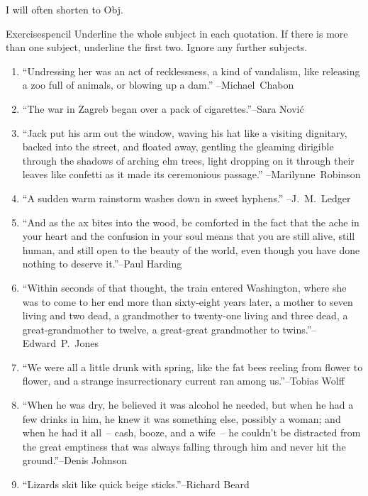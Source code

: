 I will often shorten  to Obj.


\begin{tblsframedsymbol}{Exercises}{pencil}
    Underline the whole subject in each quotation. If there is more than one subject, underline the first two. Ignore any further subjects.
    \begin{enumerate}[noitemsep, leftmargin=*]
        \item \enquote{Undressing her was an act of recklessness, a kind of vandalism, like releasing a zoo full of animals, or blowing up a dam.} \phantom{xxxxxxxxxxxxxx} \hfill--Michael~Chabon
       \item \enquote{The war in Zagreb began over a pack of cigarettes.}\hfill--Sara Nović
       \item \enquote{Jack put his arm out the window, waving his hat like a visiting dignitary, backed into the street, and floated away, gentling the gleaming dirigible through the shadows of arching elm trees, light dropping on it through their leaves like confetti as it made its ceremonious passage.} \phantom{xxxxxxxx} \hfill--Marilynne~Robinson
     \item \enquote{A sudden warm rainstorm washes down in sweet hyphens.}\phantom{xxxxxxxx} \hfill--J.~M.~Ledger
     \item \enquote{And as the ax bites into the wood, be comforted in the fact that the ache in your heart and the confusion in your soul means that you are still alive, still human, and still open to the beauty of the world, even though you have done nothing to deserve it.}\hfill--Paul Harding
     \item \enquote{Within seconds of that thought, the train entered Washington, where she was to come to her end more than sixty-eight years later, a mother to seven living and two dead, a grandmother to twenty-one living and three dead, a great-grandmother to twelve, a great-great grandmother to twins.}\hfill--Edward~P.~Jones
     \item \enquote{We were all a little drunk with spring, like the fat bees reeling from flower to flower, and a strange insurrectionary current ran among us.}\hfill--Tobias Wolff
     \item \enquote{When he was dry, he believed it was alcohol he needed, but when he had a few drinks in him, he knew it was something else, possibly a woman; and when he had it all~-- cash, booze, and a wife~-- he couldn't be distracted from the great emptiness that was always falling through him and never hit the ground.}\hfill--Denis Johnson
     \item \enquote{Lizards skit like quick beige sticks.}\hfill--Richard Beard
    \end{enumerate}
\end{tblsframedsymbol}

